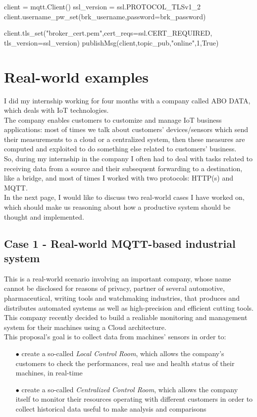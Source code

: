 \documentclass[12pt]{report}
\begin{document}
{{\begin{python}
client = mqtt.Client()
ssl_version = ssl.PROTOCOL_TLSv1_2
client.username_pw_set(brk_username,password=brk_password)

client.tls_set("broker_cert.pem",cert_reqs=ssl.CERT_REQUIRED,  tls_version=ssl_version)
publishMsg(client,topic_pub,"online",1,True)
\end{python}


\chapter{Real-world examples}
\bigskip
I did my internship working for four months with a company called ABO DATA, which deals with IoT technologies.\\
The company enables customers to customize and manage IoT business applications: most of times we talk about customers' devices/sensors which send their measurements to a cloud or a centralized system, then these measures are computed and exploited to do something else related to customers' business.\\
So, during my internship in the company I often had to deal with tasks related to receiving data from a source and their subsequent forwarding to a destination, like a bridge, and most of times I worked with two protocols: HTTP(s) and MQTT.\\

In the next page, I would like to discuss two real-world cases I have worked on, which should make us reasoning about how a productive system should be thought and implemented.\\

\clearpage
\section{Case 1 - Real-world MQTT-based industrial system}
\bigskip
This is a real-world scenario involving an important company, whose name cannot be disclosed for reasons of privacy, partner of several automotive, pharmaceutical, writing tools and watchmaking industries, that produces and distributes automated systems as well as high-precision and efficient cutting tools.\\

This company recently decided to build a realiable monitoring and management system for their machines using a Cloud architecture.\\
This proposal's goal is to collect data from machines' sensors in order to:

\begin{itemize}
\setlength{\itemindent}{+4mm}
\item[$\bullet$] create a so-called \emph{Local Control Room}, which allows the company's customers to check the performances, real use and health status of their machines, in real-time
\item[$\bullet$] create a so-called \emph{Centralized Control Room}, which allows the company itself to monitor their resources operating with different customers in order to collect historical data useful to make analysis and comparisons
\end{itemize}

}}
\end{document}
